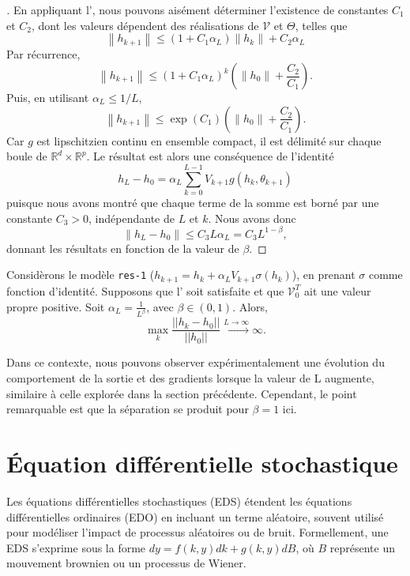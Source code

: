 \begin{proof}[]
    En appliquant l', nous pouvons aisément déterminer l'existence de constantes $C_1$ et $C_2$, dont les valeurs dépendent des réalisations de $\mathscr{V}$ et $\Theta$, telles que
    $$
        \left\|h_{k+1}\right\| \leqslant\left(1+C_1 \alpha_L\right)\left\|h_k\right\|+C_2 \alpha_L
    $$
    Par récurrence,
    $$
        \left\|h_{k+1}\right\| \leqslant\left(1+C_1 \alpha_L\right)^k\left(\left\|h_0\right\|+\frac{C_2}{C_1}\right) .
    $$
    Puis, en utilisant $\alpha_L \leqslant 1 / L$,
    $$
        \left\|h_{k+1}\right\| \leqslant \exp \left(C_1\right)\left(\left\|h_0\right\|+\frac{C_2}{C_1}\right) .
    $$
    Car $g$ est lipschitzien continu en ensemble compact, il est délimité sur chaque boule de $\mathbb{R}^d \times \mathbb{R}^p$. Le résultat est alors une conséquence de l'identité
    $$
        h_L-h_0=\alpha_L \sum_{k=0}^{L-1} V_{k+1} g\left(h_k, \theta_{k+1}\right)
    $$
    puisque nous avons montré que chaque terme de la somme est borné par une constante $C_3>0$, indépendante de $L$ et $k$. Nous avons donc 
    $$
        \left\|h_L-h_0\right\| \leqslant C_3 L \alpha_L=C_3 L^{1-\beta},
    $$
    donnant les résultats en fonction de la valeur de $\beta$.
\end{proof}

\begin{proposition}\label{prop13}
    Considèrons le modèle \texttt{res-1} ($h_{k+1} = h_k +\alpha_{L}V_{k+1}\sigma(h_k) $), en prenant $\sigma$ comme fonction d'identité. Supposons que l' soit satisfaite et que $\mathcal{V} _0 ^T$ ait une valeur propre positive. Soit $\alpha_L = \frac{1}{L^{\beta}}$, avec $\beta \in (0,1)$. Alors, 
    \[
        \max_{k}\frac{||h_k-h_0||}{||h_0||} \xrightarrow{L \to \infty } \infty
    .\]
\end{proposition}
Dans ce contexte, nous pouvons observer expérimentalement une évolution du comportement de la sortie et des gradients lorsque la valeur de L augmente, similaire à celle explorée dans la section précédente. Cependant, le point remarquable est que la séparation se produit pour $\beta = 1$ ici.

\section{Équation différentielle stochastique}
Les équations différentielles stochastiques (EDS) étendent les équations différentielles ordinaires (EDO) en incluant un terme aléatoire, souvent utilisé pour modéliser l'impact de processus aléatoires ou de bruit. Formellement, une EDS s'exprime sous la forme $dy = f(k,y)dk + g(k,y)dB$, où $B$ représente un mouvement brownien ou un processus de Wiener.


